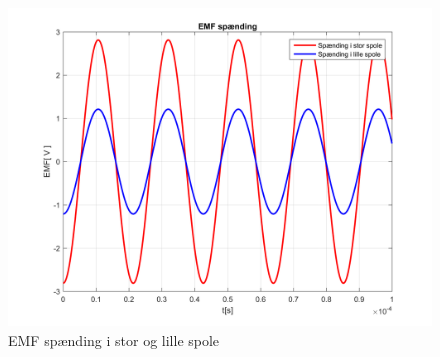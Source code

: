 \begin{figure}[h!]
	\centering
	\includegraphics[width=1\textwidth]{billeder/EMF_spanding.png}
	\caption{EMF spænding i stor og lille spole}
	\label{fig:EMF_spole}
\end{figure}

